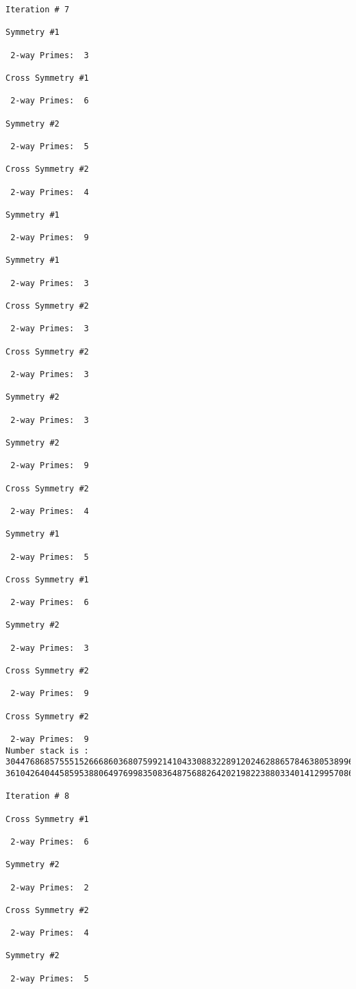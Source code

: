 {{{{\begin{verbatim}
Iteration #	7

Symmetry #1

 2-way Primes: 	3

Cross Symmetry #1

 2-way Primes: 	6

Symmetry #2

 2-way Primes: 	5

Cross Symmetry #2

 2-way Primes: 	4

Symmetry #1

 2-way Primes: 	9

Symmetry #1

 2-way Primes: 	3

Cross Symmetry #2

 2-way Primes: 	3

Cross Symmetry #2

 2-way Primes: 	3

Symmetry #2

 2-way Primes: 	3

Symmetry #2

 2-way Primes: 	9

Cross Symmetry #2

 2-way Primes: 	4

Symmetry #1

 2-way Primes: 	5

Cross Symmetry #1

 2-way Primes: 	6

Symmetry #2

 2-way Primes: 	3

Cross Symmetry #2

 2-way Primes: 	9

Cross Symmetry #2

 2-way Primes: 	9
Number stack is :
30447686857555152666860368075992141043308832289120246288657846380538996794608835958544046240163340857
36104264044585953880649769983508364875688264202198223880334014129957086306866625155575868674403758043

Iteration #	8

Cross Symmetry #1

 2-way Primes: 	6

Symmetry #2

 2-way Primes: 	2

Cross Symmetry #2

 2-way Primes: 	4

Symmetry #2

 2-way Primes: 	5


\end{verbatim}}}}}
